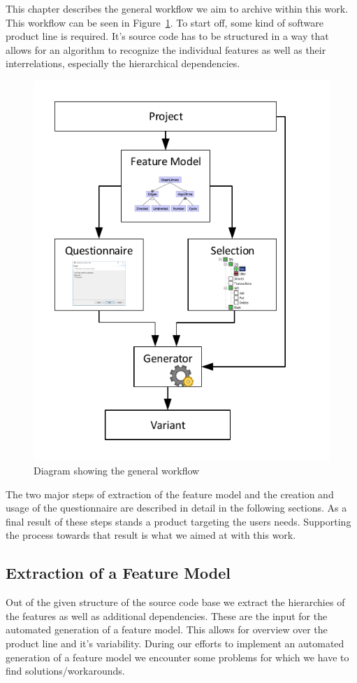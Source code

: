 This chapter describes the general workflow we aim to archive within this work. This workflow can be seen in Figure~\ref{img-workflow}. To start off, some kind of software product line is required. It's source code has to be structured in a way that allows for an algorithm to recognize the individual features as well as their interrelations, especially the hierarchical dependencies.

\begin{figure}[H]
	\includegraphics{img/img-workflow.pdf}
	\caption{Diagram showing the general workflow}
	\label{img-workflow}
\end{figure}

The two major steps of extraction of the feature model and the creation and usage of the questionnaire are described in detail in the following sections. As a final result of these steps stands a product targeting the users needs. Supporting the process towards that result is what we aimed at with this work.


\subsection{Extraction of a Feature Model}
Out of the given structure of the source code base we extract the hierarchies of the features as well as additional dependencies. These are the input for the automated generation of a feature model. This allows for overview over the product line and it's variability. During our efforts to implement an automated generation of a feature model we encounter some problems for which we have to find solutions/workarounds.

